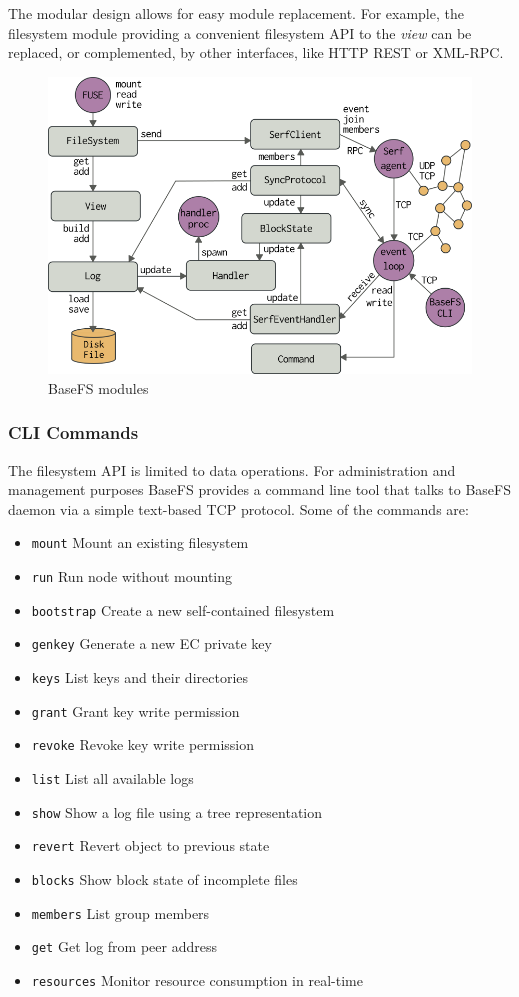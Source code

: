 \documentclass{sig-alternate}
\begin{document}
The modular design allows for easy module replacement. For example, the filesystem module providing a convenient filesystem API to the \textit{view} can be replaced, or complemented, by other interfaces, like HTTP REST or XML-RPC.

\begin{figure}
\centering
\includegraphics[width=\columnwidth]{imgs/modules.png}
\caption{BaseFS modules}
\label{fig:modules}
\end{figure}

\subsubsection{CLI Commands}
The filesystem API is limited to data operations. For administration and management purposes BaseFS provides a command line tool that talks to BaseFS daemon via a simple text-based TCP protocol. Some of the commands are:

\begin{itemize}
 \item \texttt{mount}	Mount an existing filesystem
 \item \texttt{run}	Run node without mounting
 \item \texttt{bootstrap}	Create a new self-contained filesystem
 \item \texttt{genkey}	Generate a new EC private key
 \item \texttt{keys}	List keys and their directories
 \item \texttt{grant}	Grant key write permission
 \item \texttt{revoke}	Revoke key write permission
 \item \texttt{list}	List all available logs
 \item \texttt{show}	Show a log file using a tree representation
 \item \texttt{revert}	Revert object to previous state
 \item \texttt{blocks}	Show block state of incomplete files
 \item \texttt{members}	List group members
 \item \texttt{get}		Get log from peer address
 \item \texttt{resources}	Monitor resource consumption in real-time
\end{itemize}
\end{document}
